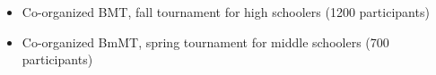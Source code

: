 {
	\begin{itemize}
		\item Co-organized BMT, fall tournament for high schoolers (1200 participants)
		\item Co-organized BmMT, spring tournament for middle schoolers (700 participants)
	\end{itemize}
}

